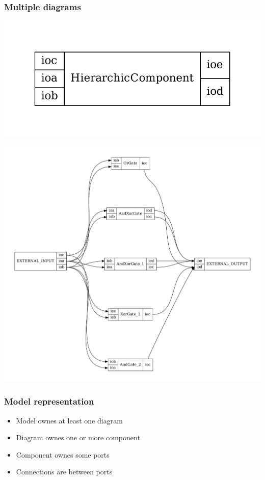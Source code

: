 \documentclass[11pt, handout]{beamer}
\begin{document}
\begin{frame}
  \frametitle{Multiple diagrams}
  \begin{minipage}{0.30\textwidth}
    \includegraphics[width=1.0\textwidth]{hierarchic_component}
  \end{minipage}
  \hfill
  \begin{minipage}{0.69\textwidth}
    \includegraphics[width=1.0\textwidth]{hierarchic_component_inside}
  \end{minipage}
\end{frame}

\begin{frame}
  \frametitle{Model representation}
  \begin{itemize}
  \item Model ownes at least one diagram
  \item Diagram ownes one or more component
  \item Component ownes some ports
  \item Connections are between ports
  \end{itemize}
\end{frame}
\end{document}
